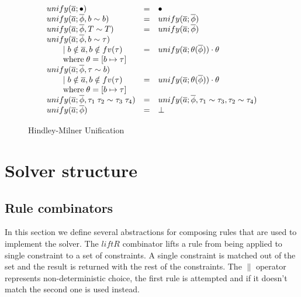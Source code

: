 \begin{figure}
\[
\begin{array}{l c l}
unify(\overline{a}; \bullet) &=& \bullet
\\
unify(\overline{a}; \overline{\phi}, b \sim b) &=& unify(\overline{a};
\overline{\phi})
\\
unify(\overline{a}; \overline{\phi}, T \sim T) &=& unify(\overline{a};
\overline{\phi})
\\
unify(\overline{a}; \overline{\phi}, b \sim \tau)
\\ \qquad \mid b \notin \overline{a}, b \notin fv(\tau) &=& unify(\overline{a};
\theta(\overline{\phi})) \cdot \theta
\\ \qquad \text{where} \; \theta = [b \mapsto \tau]
\\
unify(\overline{a}; \overline{\phi}, \tau \sim b)
\\ \qquad \mid b \notin \overline{a}, b \notin fv(\tau) &=& unify(\overline{a};
\theta(\overline{\phi})) \cdot \theta
\\ \qquad \text{where} \; \theta = [b \mapsto \tau]
\\
unify(\overline{a}; \overline{\phi}, \tau_1 \; \tau_2 \sim \tau_3 \; \tau_4) &=&
unify(\overline{a}; \overline{\phi}, \tau_1 \sim \tau_3, \tau_2 \sim \tau_4)
\\
unify(\overline{a}; \overline{\phi}) &=& \bot
\end{array}
\]
\caption{Hindley-Milner Unification}
\label{fig:unify}
\end{figure}

\section{Solver structure}

\subsection{Rule combinators}
In this section we define several abstractions for composing rules that are used
to implement the solver. The $liftR$ combinator lifts a rule from being applied
to single constraint to a set of constraints. A single constraint is
matched out of the set and the result is returned with the rest of the
constraints. The $\|$ operator represents non-deterministic choice, the first
rule is attempted and if it doesn't match the second one is used instead.

